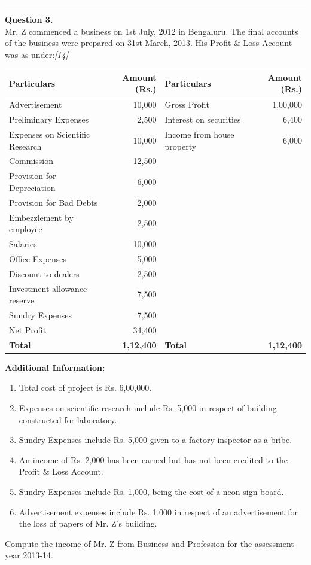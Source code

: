 \documentclass[11pt,a4paper]{article}
\newcommand{\pts}[1]{\hfill   \textit{[#1]}}
\begin{document}
\medskip\rule{\linewidth}{0.2pt}

\pagebreak




\noindent   \textbf{Question 3.} \\
Mr. Z commenced a business on 1st July, 2012 in Bengaluru. The final accounts of the business were prepared on 31st March, 2013. His Profit \& Loss Account was as under:\pts{14}

\begin{center}
\small
\renewcommand{\arraystretch}{1.2}

\begin{tabular}{|l|r|l|r|}
\hline
   \textbf{Particulars} &   \textbf{Amount (Rs.)} &   \textbf{Particulars} &   \textbf{Amount (Rs.)} \\ \hline
Advertisement & 10,000 & Gross Profit & 1,00,000 \\
Preliminary Expenses & 2,500 & Interest on securities & 6,400 \\
Expenses on Scientific Research & 10,000 & Income from house property & 6,000 \\
Commission & 12,500 & & \\
Provision for Depreciation & 6,000 & & \\
Provision for Bad Debts & 2,000 & & \\
Embezzlement by employee & 2,500 & & \\
Salaries & 10,000 & & \\
Office Expenses & 5,000 & & \\
Discount to dealers & 2,500 & & \\
Investment allowance reserve & 7,500 & & \\
Sundry Expenses & 7,500 & & \\
Net Profit & 34,400 & & \\ \hline
   \textbf{Total} &   \textbf{1,12,400} &   \textbf{Total} &   \textbf{1,12,400} \\ \hline
\end{tabular}
\end{center}




\noindent   \textbf{Additional Information:}

\begin{enumerate}[label=(\roman*),itemsep=2pt,topsep=2pt]
  \item Total cost of project is Rs. 6,00,000.
  \item Expenses on scientific research include Rs. 5,000 in respect of building constructed for laboratory.
  \item Sundry Expenses include Rs. 5,000 given to a factory inspector as a bribe.
  \item An income of Rs. 2,000 has been earned but has not been credited to the Profit \& Loss Account.
  \item Sundry Expenses include Rs. 1,000, being the cost of a neon sign board.
  \item Advertisement expenses include Rs. 1,000 in respect of an advertisement for the loss of papers of Mr. Z's building.
\end{enumerate}
Compute the income of Mr. Z from Business and Profession for the assessment year 2013-14.
\end{document}
